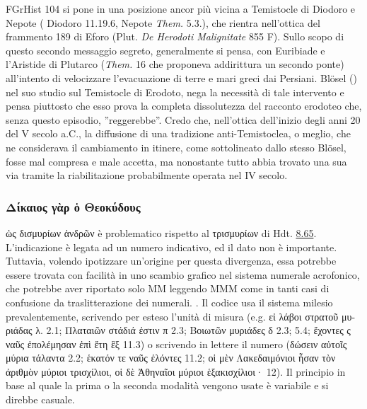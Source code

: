 {    FGrHist 104 si pone in una posizione ancor più vicina a Temistocle di  Diodoro e  Nepote ( Diodoro 11.19.6,  Nepote \emph{Them.}  5.3.), che rientra nell'ottica del frammento 189 di Eforo\label{ref:EforoF189plutdemalign855f} (Plut. \emph{De Herodoti Malignitate} 855 F). Sullo scopo di questo secondo messaggio segreto, generalmente si pensa, con  Euribiade  e l'Aristide di Plutarco (\emph{Them.}  16 che proponeva addirittura un secondo ponte) all'intento di  velocizzare l'evacuazione di terre e mari greci dai Persiani. Blösel (\cite[270s]{Blosel2004}) nel suo studio sul Temistocle di Erodoto, nega la necessità di tale intervento e pensa piuttosto che esso prova la completa dissolutezza del racconto erodoteo che, senza questo episodio, ''reggerebbe''. Credo che, nell'ottica dell'inizio degli anni 20 del V secolo a.C., la diffusione di una tradizione anti-Temistoclea, o meglio, che ne considerava il cambiamento in itinere, come sottolineato dallo stesso Blösel, fosse mal compresa e male accetta, ma nonostante tutto abbia trovato una sua via tramite la riabilitazione probabilmente operata nel IV secolo. 
    \subsubsection{\textgreek{Δίκαιος γὰρ ὁ Θεοκύδους}}
    \textgreek{ὡς δισμυρίων ἀνδρῶν} è problematico rispetto al \textgreek{τρισμυρίων} di Hdt. \href{http://data.perseus.org/citations/urn:cts:greekLit:tlg0016.tlg001.perseus-grc1:8.65}{8.65}. L'indicazione è legata ad un numero indicativo, ed il dato non è importante. Tuttavia, volendo ipotizzare un'origine per questa divergenza, essa potrebbe essere trovata con facilità in uno scambio grafico nel sistema numerale acrofonico, che potrebbe aver riportato solo \textgreek{MM} leggendo \textgreek{MMM} come in tanti casi di confusione da traslitterazione dei numerali. \cite[147s]{Ronconi2003}. Il codice usa il sistema milesio prevalentemente, scrivendo per esteso l'unità di misura (e.g. \textgreek{εἰ λάβοι στρατοῦ μυριάδας λ.} 2.1; \textgreek{Πλαταιῶν στάδιά ἐστιν π} 2.3; \textgreek{Βοιωτῶν μυριάδες δ} 2.3; 5.4; \textgreek{ἔχοντες ς ναῦς ἐπολέμησαν ἐπὶ ἔτη ἓξ} 11.3) o scrivendo in lettere il numero (\textgreek{δώσειν αὐτοῖς μύρια τάλαντα}  2.2; \textgreek{ἑκατόν τε ναῦς ἑλόντες } 11.2; \textgreek{οἱ μὲν Λακεδαιμόνιοι ἦσαν τὸν ἀριθμὸν μύριοι τρισχίλιοι, οἱ δὲ Ἀθηναῖοι μύριοι ἑξακισχίλιοι·}  12). Il principio in base al quale la prima o la seconda modalità vengono usate è variabile e si direbbe casuale.
}
